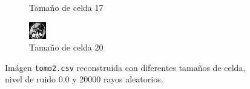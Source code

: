\documentclass{beamer}
\begin{document}
\begin{frame}
\begin{figure}
\begin{subfigure}{0.4\linewidth}
  \caption{Tamaño de celda 17}
\end{subfigure}%
\begin{subfigure}{0.4\linewidth}
  \centering
  \includegraphics[width=0.6\linewidth]{celdas/tomo2-20-0}
  \caption{Tamaño de celda 20}
\end{subfigure}%

\caption{Imágen \texttt{tomo2.csv} reconstruida con diferentes tamaños de celda, nivel de ruido 0.0 y 20000 rayos aleatorios.}
\label{fig:muestras_celdas}
\end{figure}

\end{frame}
\end{document}
